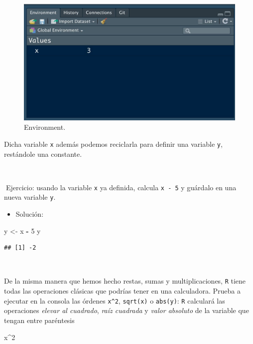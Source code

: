 \documentclass[11pt,]{book}
\newenvironment{Shaded}{\begin{snugshade}}{\end{snugshade}}
\newcommand{\DecValTok}[1]{\textcolor[rgb]{0.06,0.06,0.06}{#1}}
\newcommand{\NormalTok}[1]{#1}
\newcommand{\OperatorTok}[1]{\textcolor[rgb]{0.43,0.43,0.43}{\textbf{#1}}}
\newcommand{\StringTok}[1]{\textcolor[rgb]{0.5,0.5,0.5}{#1}}
\providecommand{\tightlist}{%
  \setlength{\itemsep}{0pt}\setlength{\parskip}{0pt}}
\begin{document}
\begin{figure}

{\centering \includegraphics[width=0.75\linewidth]{./img/environment_1} 

}

\caption{Environment.}\label{fig:unnamed-chunk-5}
\end{figure}

Dicha variable \texttt{x} además podemos reciclarla para definir una variable \texttt{y}, restándole una constante.

~

📝Ejercicio: usando la variable \texttt{x} ya definida, calcula \texttt{x\ -\ 5} y guárdalo en una nueva variable \texttt{y}.

\begin{itemize}
\tightlist
\item
  Solución:
\end{itemize}

\begin{Shaded}
\begin{Highlighting}[]
\NormalTok{y <-}\StringTok{ }\NormalTok{x }\OperatorTok{-}\StringTok{ }\DecValTok{5}
\NormalTok{y}
\end{Highlighting}
\end{Shaded}

\begin{verbatim}
## [1] -2
\end{verbatim}

~

De la misma manera que hemos hecho restas, sumas y multiplicaciones, \texttt{R} tiene todas las operaciones clásicas que podrías tener en una calculadora. Prueba a ejecutar en la consola las órdenes \texttt{x\^{}2}, \texttt{sqrt(x)} o \texttt{abs(y)}: \texttt{R} calculará las operaciones \emph{elevar al cuadrado}, \emph{raíz cuadrada} y \emph{valor absoluto} de la variable que tengan entre paréntesis

\begin{Shaded}
\begin{Highlighting}[]
\NormalTok{x}\OperatorTok{^}\DecValTok{2}
\end{Highlighting}
\end{Shaded}
\end{document}
